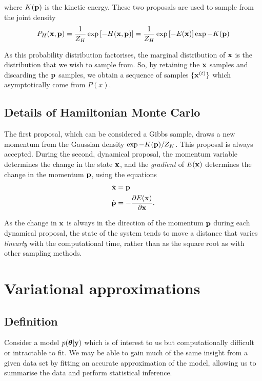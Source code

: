 \documentclass{amsart}[12pt]
\begin{document}
where $K({\bf p})$ is the kinetic energy. These two proposals are used to sample from the joint density
\[
	P_H({\bf x}, {\bf p}) = \frac{1}{Z_H} \exp{[-H({\bf x}, {\bf p})]} = \frac{1}{Z_H} \exp{[-E({\bf x})]} \exp{-K({\bf p})}
\]

As this probability distribution factorises, the marginal distribution of ${\bf x}$ is the distribution that we
wish to sample from. So, by retaining the ${\bf x}$ samples and discarding the ${\bf p}$ samples, we obtain a sequence
of samples $\{ {\bf x}^{(t)} \}$ which asymptotically come from $P(x)$.

\subsection{Details of Hamiltonian Monte Carlo}

The first proposal, which can be considered a Gibbs sample, draws a new momentum from the Gaussian density
$\exp{-K({\bf p})}/Z_K$. This proposal is always accepted. During the second, dynamical proposal, the momentum
variable determines the change in the state ${\bf x}$, and the \emph{gradient} of $E({\bf x})$ determines the change
in the momentum ${\bf p}$, using the equations
\begin{align*}
\dot{{\bf x}} &= {\bf p} \\
\dot{{\bf p}} &= -\frac{\partial E({\bf x})}{\partial {\bf x}}.
\end{align*}

As the change in ${\bf x}$ is always in the direction of the momentum ${\bf p}$ during each dynamical proposal, the
state of the system tends to move a distance that varies \emph{linearly} with the computational time, rather
than as the square root as with other sampling methods.



\section{Variational approximations}

\subsection{Definition}

Consider a model $p({\boldsymbol \theta}|{\bf y})$ which is of interest to us but computationally difficult or intractable to 
fit. We may be able to gain much of the same insight from a given data set by fitting an accurate approximation 
of the model, allowing us to summarise the data and perform statistical inference.
\end{document}
